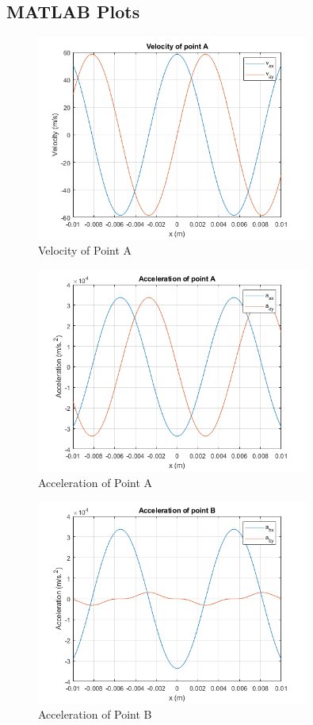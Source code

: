 \documentclass[12pt, titlepage]{article}
\begin{document}
\subsection{MATLAB Plots}
\begin{figure}[H]
    \centering
    \includegraphics[width=0.8\textwidth]{./Images/1.png}
    \caption{Velocity of Point A}
    \label{fig:vel}
\end{figure}
\begin{figure}[H]
    \centering
    \includegraphics[width=0.8\textwidth]{./Images/2.png}
    \caption{Acceleration of Point A}
    \label{fig:acc}
\end{figure}
\begin{figure}[H]
    \centering
    \includegraphics[width=0.8\textwidth]{./Images/3.png}
    \caption{Acceleration of Point B}
    \label{fig:accb}
\end{figure}
\end{document}
